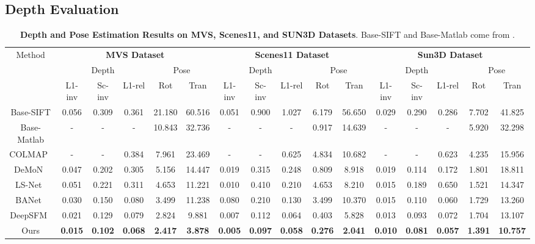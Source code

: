 \documentclass[final]{cvpr}
\begin{document}
\subsection{Depth Evaluation}
\begin{table*}[t]
\begin{centering}
\tabcolsep=0.09cm
\small
\caption{\textbf{Depth and Pose Estimation Results on MVS, Scenes11, and SUN3D Datasets}. Base-SIFT and Base-Matlab come from \cite{ummenhofer2017demon}.}
\label{tab:demon_depth_pose}
\begin{tabular}{c||ccc|cc||ccc|cc||ccc|cc}
\hline
\multirow{3}{*}{Method} & \multicolumn{5}{c||}{{\textbf{MVS Dataset} }} &\multicolumn{5}{c||}{{\textbf{Scenes11 Dataset}}} &\multicolumn{5}{c}{{\textbf{Sun3D Dataset}}} \\
 \cline{2-16}
&\multicolumn{3}{c|}{{Depth}} & \multicolumn{2}{c||}{{Pose}}&\multicolumn{3}{c|}{{Depth}} & \multicolumn{2}{c||}{{Pose}}&\multicolumn{3}{c|}{{Depth}} & \multicolumn{2}{c}{{Pose}} \\
& L1-inv &Sc-inv &L1-rel & Rot & Tran &L1-inv &Sc-inv &L1-rel & Rot & Tran&L1-inv &Sc-inv &L1-rel & Rot & Tran\\
\hline
Base-SIFT &0.056 &0.309 &0.361 &21.180& 60.516& 0.051& 0.900& 1.027 &6.179& 56.650 & 0.029& 0.290& 0.286& 7.702& 41.825\\
Base-Matlab & - &- &- &10.843& 32.736&  - &- &-& 0.917 &14.639& - &- &- &5.920& 32.298\\
COLMAP~\cite{colmap}&-&-&0.384& 7.961&23.469&-&-&0.625&4.834&10.682 &-&-&0.623&4.235&15.956  \\

DeMoN~\cite{ummenhofer2017demon} & 0.047 & 0.202 & 0.305 & 5.156 & 14.447 & 0.019 & 0.315 & 0.248 & 0.809 & 8.918 & 0.019 &0.114 &0.172& 1.801 & 18.811\\

LS-Net~\cite{clark2018ls} & 0.051 & 0.221 & 0.311 & 4.653 & 11.221 &  0.010& 0.410& 0.210 &4.653 &8.210 & 0.015 & 0.189 & 0.650& 1.521& 14.347  \\
BANet~\cite{tang2018ba} & 0.030 & 0.150 & 0.080 & 3.499 & 11.238 & 0.080 &0.210& 0.130 &3.499 &10.370 & 0.015 & 0.110 & 0.060 & 1.729 & 13.260 \\
DeepSFM~\cite{wei2019deepsfm} &  0.021 &  0.129 &  0.079 &  2.824 &  9.881  &  0.007  & 0.112 &  0.064  & 0.403 &  5.828 & 0.013 & 0.093 & 0.072 & 1.704 & 13.107 \\
Ours &\textbf{0.015}&\textbf{0.102}&\textbf{0.068}& \textbf{2.417}&\textbf{3.878}& \textbf{0.005}&\textbf{0.097} & \textbf{0.058} & \textbf{0.276}&\textbf{2.041}&\textbf{0.010}&\textbf{0.081}&\textbf{0.057}&\textbf{1.391} &\textbf{10.757} \\
\hline
\end{tabular}
\end{centering}
\end{table*}
\end{document}

